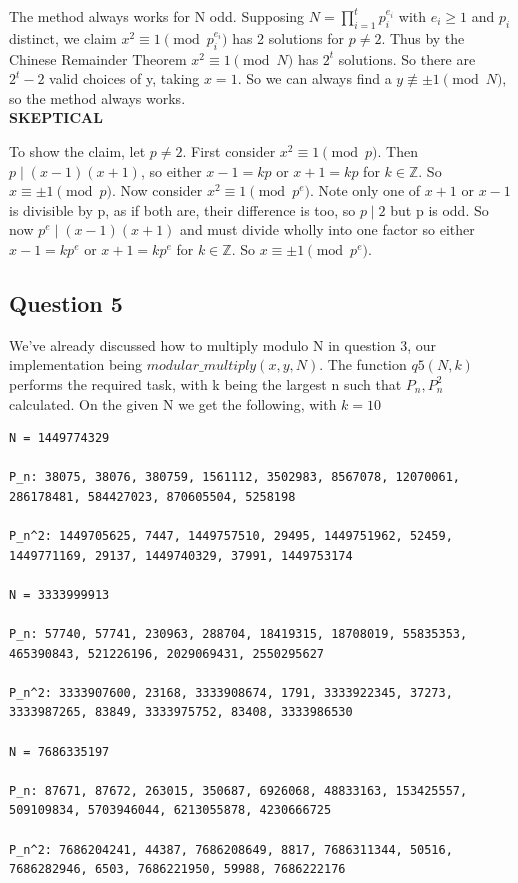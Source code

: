 \documentclass[10pt,a4paper]{report}
\begin{document}
The method always works for N odd. Supposing $N=\prod_{i=1}^t p_i^{e_i}$ with $e_i\geq1$ and $p_i$ distinct, we claim $x^2 \equiv 1 \pmod{p_i^{e_i}}$ has 2 solutions for $p\neq2$. Thus by the Chinese Remainder Theorem $x^2\equiv 1 \pmod N$ has $2^t$ solutions. So there are $2^t-2$ valid choices of y, taking $x=1$. So we can always find a $y\not\equiv \pm1 \pmod N$, so the method always works.\\ \textbf{SKEPTICAL}

To show the claim, let $p\neq2$. First consider $x^2\equiv 1 \pmod p$. Then $p \mid (x-1)(x+1)$, so either $x-1=kp$ or $x+1=kp$ for $k\in\mathbb{Z}$. So $x\equiv\pm 1 \pmod p$. Now consider $x^2\equiv 1 \pmod{p^e}$. Note only one of $x+1$ or $x-1$ is divisible by p, as if both are, their difference is too, so $p \mid 2$ but p is odd. So now $p^e \mid (x-1)(x+1)$ and must divide wholly into one factor so either $x-1=kp^e$ or $x+1=kp^e$ for $k\in\mathbb{Z}$. So $x\equiv\pm 1 \pmod{p^e}$.

\subsection*{Question 5}

We've already discussed how to multiply modulo N in question 3, our implementation being $modular\_multiply(x,y,N)$. The function $q5(N,k)$ performs the required task, with k being the largest n such that $P_n, P_n^2$ calculated. On the given N we get the following, with $k=10$


\begin{lstlisting}[breaklines]	
N = 1449774329

P_n: 38075, 38076, 380759, 1561112, 3502983, 8567078, 12070061, 286178481, 584427023, 870605504, 5258198

P_n^2: 1449705625, 7447, 1449757510, 29495, 1449751962, 52459, 1449771169, 29137, 1449740329, 37991, 1449753174

N = 3333999913

P_n: 57740, 57741, 230963, 288704, 18419315, 18708019, 55835353, 465390843, 521226196, 2029069431, 2550295627

P_n^2: 3333907600, 23168, 3333908674, 1791, 3333922345, 37273, 3333987265, 83849, 3333975752, 83408, 3333986530

N = 7686335197

P_n: 87671, 87672, 263015, 350687, 6926068, 48833163, 153425557, 509109834, 5703946044, 6213055878, 4230666725

P_n^2: 7686204241, 44387, 7686208649, 8817, 7686311344, 50516, 7686282946, 6503, 7686221950, 59988, 7686222176
\end{lstlisting}
\end{document}
